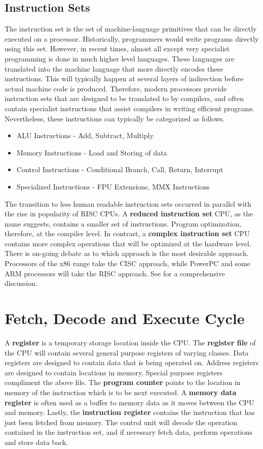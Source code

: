 \documentclass[10pt,a4paper]{article}
\begin{document}
\subsection{Instruction Sets}
The instruction set is the set of machine-language primitives that can be directly executed on a processor. Historically, programmers would write programs directly using this set. However, in recent times, almost all except very specialist programming is done in much higher level languages. These languages are translated into the machine language that more directly encodes these instructions. This will typically happen at several layers of indirection before actual machine code is produced. Therefore, modern processors provide instruction sets that are designed to be translated to by compilers, and often contain specialist instructions that assist compilers in writing efficient programs. Nevertheless, these instructions can typically be categorized as follows. 
\begin{itemize}
\item ALU Instructions - Add, Subtract, Multiply
\item Memory Instructions - Load and Storing of data
\item Control Instructions - Conditional Branch, Call, Return, Interrupt 
\item Specialized Instructions - FPU Extensions, MMX Instructions
\end{itemize}
The transition to less human readable instruction sets occurred in parallel with the rise in popularity of RISC CPUs. A \textbf{reduced instruction set} CPU, as the name suggests, contains a smaller set of instructions. Program optimization, therefore, at the compiler level. In contrast, a \textbf{complex instruction set} CPU contains more complex operations that will be optimized at the hardware level. There is on-going debate as to which approach is the most desirable approach. Processors of the x86 range take the CISC approach, while PowerPC and some ARM processors will take the RISC approach. See \cite{RISC-CISC} for a comprehensive discussion.
\section{Fetch, Decode and Execute Cycle}
A \textbf{register} is a temporary storage location inside the CPU. The \textbf{register file} of the CPU will contain several general purpose registers of varying classes. Data registers are designed to contain data that is being operated on. Address registers are designed to contain locations in memory. Special purpose registers compliment the above file. The \textbf{program counter} points to the location in memory of the instruction which is to be next executed. A \textbf{memory data register} is often used as a buffer to memory data as it moves between the CPU and memory. Lastly, the \textbf{instruction register} contains the instruction that has just been fetched from memory. The control unit will decode the operation contained in the instruction set, and if necessary fetch data, perform operations and store data back. 
\newline\newline
\end{document}
